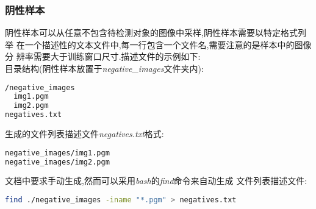 \documentclass[10pt,technote]{IEEEtran}
\begin{document}
\subsubsection{阴性样本}
阴性样本可以从任意不包含待检测对象的图像中采样,阴性样本需要以特定格式列举
在一个描述性的文本文件中,每一行包含一个文件名,需要注意的是样本中的图像分
辨率需要大于训练窗口尺寸.描述文件的示例如下:\\
目录结构(阴性样本放置于\textit{negative\_images}文件夹内):
\begin{lstlisting}[language=bash]
/negative_images
  img1.pgm
  img2.pgm
negatives.txt
\end{lstlisting}
生成的文件列表描述文件\textit{negatives.txt}格式:
\begin{lstlisting}[language=bash]
negative_images/img1.pgm
negative_images/img2.pgm
\end{lstlisting}
文档中要求手动生成,然而可以采用\textit{bash}的\textit{find}命令来自动生成
文件列表描述文件:
\begin{lstlisting}[language=bash]
find ./negative_images -iname "*.pgm" > negatives.txt
\end{lstlisting}
\end{document}
